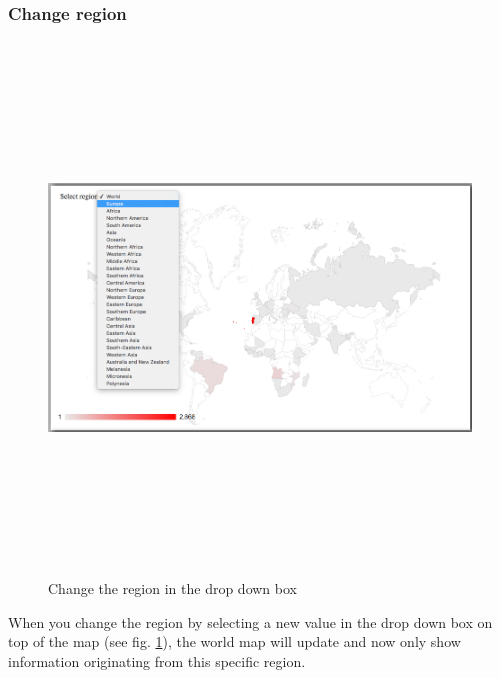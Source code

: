 \documentclass[a4paper, 11pt]{article} %
\begin{document}
\subsubsection{Change region}
\begin{figure}[H]
\centering
\includegraphics[width=400pt, height=400pt, keepaspectratio=true]{images/change_country.PNG}
\caption{Change the region in the drop down box}
\label{fig:change_region}
\end{figure}
When you change the region by selecting a new value in the drop down box on top of the map (see fig. \ref{fig:change_region}), the world map will update and now only show information originating from this specific region.
\end{document}
